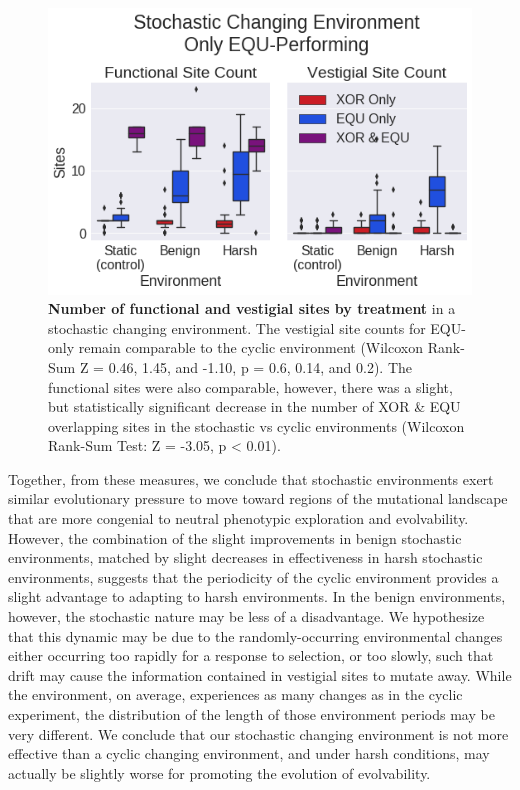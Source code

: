 \documentclass[PhD]{msu-thesis}
\begin{document}
	\begin{figure}[!h]
	\includegraphics[trim={0 0 0 0}, clip, width=0.75\columnwidth]{figures/CE/CSE_func_vest__filtered__box.png}
	\caption{\textbf{Number of functional and vestigial sites by treatment} in a stochastic changing environment. The vestigial site counts for EQU-only remain comparable to the cyclic environment (Wilcoxon Rank-Sum Z = 0.46, 1.45, and -1.10, p = 0.6, 0.14, and 0.2). The functional sites were also comparable, however, there was a slight, but statistically significant decrease in the number of XOR \& EQU overlapping sites in the stochastic vs cyclic environments (Wilcoxon Rank-Sum Test: Z = -3.05, p < 0.01).
	}
	\label{fig:CSE_func_vestigial} %
	\end{figure}

Together, from these measures, we conclude that stochastic environments exert similar evolutionary pressure to move toward regions of the mutational landscape that are more congenial to neutral phenotypic exploration and evolvability. However, the combination of the slight improvements in benign stochastic environments, matched by slight decreases in effectiveness in harsh stochastic environments, suggests that the periodicity of the cyclic environment provides a slight advantage to adapting to harsh environments. In the benign environments, however, the stochastic nature may be less of a disadvantage. We hypothesize that this dynamic may be due to the randomly-occurring environmental changes either occurring too rapidly for a response to selection, or too slowly, such that drift may cause the information contained in vestigial sites to mutate away. While the environment, on average, experiences as many changes as in the cyclic experiment, the distribution of the length of those environment periods may be very different. We conclude that our stochastic changing environment is not more effective than a cyclic changing environment, and under harsh conditions, may actually be slightly worse for promoting the evolution of evolvability.
\end{document}
